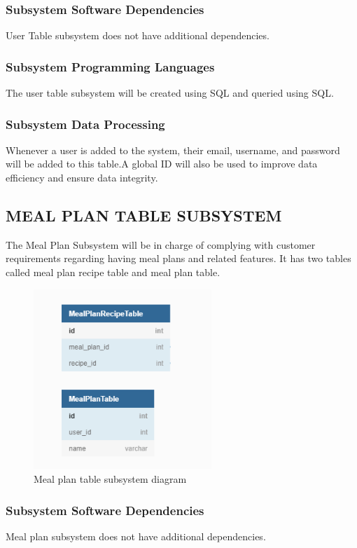 \subsubsection{Subsystem Software Dependencies}
User Table subsystem does not have additional dependencies.

\subsubsection{Subsystem Programming Languages}
The user table subsystem will be created using SQL and queried using SQL.

\subsubsection{Subsystem Data Processing}
Whenever a user is added to the system, their email, username, and password will be added to this table.A global ID will also be used to improve data efficiency and ensure data integrity. 

\subsection{MEAL PLAN TABLE SUBSYSTEM }
The Meal Plan Subsystem will be in charge of complying with customer requirements regarding having meal plans and related features. It has two tables called meal plan recipe table and meal plan table.

\begin{figure}[h!]
	\centering
 	\includegraphics[width=0.60\textwidth]{images/MealPlan_SubSystem.png}
 \caption{Meal plan table subsystem diagram}
\end{figure}

\subsubsection{Subsystem Software Dependencies}
Meal plan subsystem does not have additional dependencies.

